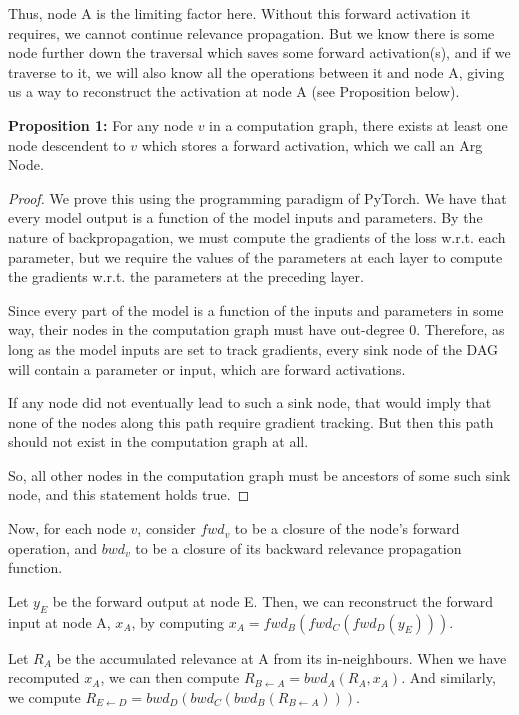 \documentclass{article}
\begin{document}
Thus, node A is the limiting factor here. Without this forward activation it requires, we cannot continue relevance
propagation. But we know there is some node further down the traversal which saves some forward activation(s),
and if we traverse to it, we will also know all the operations between it and node A, giving us a way to reconstruct
the activation at node A (see Proposition below).

\textbf{Proposition 1:} For any node $v$ in a computation graph, there exists at least one node descendent to $v$
which stores a forward activation, which we call an Arg Node.

\begin{proof}
  We prove this using the programming paradigm of PyTorch. We have that every model output is a function of the
  model inputs and parameters. By the nature of backpropagation, we must compute the gradients of the loss w.r.t.
  each parameter, but we require the values of the parameters at each layer to compute the gradients w.r.t. the
  parameters at the preceding layer.
  
  Since every part of the model is a function of the inputs and parameters in some way, their nodes in the
  computation graph must have out-degree 0. Therefore, as long as the model inputs are set to track gradients,
  every sink node of the DAG will contain a parameter or input, which are forward activations.
  
  If any node did not eventually lead to such a sink node, that would imply that none of the nodes along this
  path require gradient tracking. But then this path should not exist in the computation graph at all.

  So, all other nodes in the computation graph must be ancestors of some such sink node, and this statement holds true.
\end{proof}

Now, for each node $v$, consider $fwd_v$ to be a closure of the node's forward operation, and $bwd_v$ to be a closure of
its backward relevance propagation function.

Let $y_E$ be the forward output at node E. Then, we can reconstruct the forward input at node A, $x_A$, by computing
$x_A = fwd_B(fwd_C(fwd_D(y_E)))$.

Let $R_A$ be the accumulated relevance at A from its in-neighbours. When we have recomputed $x_A$, we can then compute
$R_{B \leftarrow A} = bwd_A(R_A, x_A)$. And similarly, we compute $R_{E \leftarrow D} = bwd_D(bwd_C(bwd_B(R_{B \leftarrow A})))$.
\end{document}
